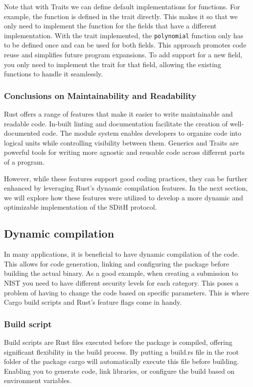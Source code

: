 \documentclass[11pt]{report}
\theoremstyle{definition}
\theoremstyle{plain}
\begin{document}
Note that with Traits we can define default implementations for functions. For example, the  function is defined in the trait directly. This makes it so that we only need to implement the function for the fields that have a different implementation. With the trait implemented, the \texttt{polynomial} function only has to be defined once and can be used for both fields. This approach promotes code reuse and simplifies future program expansions. To add support for a new field, you only need to implement the  trait for that field, allowing the existing functions to handle it seamlessly.

\subsubsection{Conclusions on Maintainability and Readability}
Rust offers a range of features that make it easier to write maintainable and readable code. In-built linting and documentation facilitate the creation of well-documented code. The module system enables developers to organize code into logical units while controlling visibility between them. Generics and Traits are powerful tools for writing more agnostic and reusable code across different parts of a program.

However, while these features support good coding practices, they can be further enhanced by leveraging Rust's dynamic compilation features. In the next section, we will explore how these features were utilized to develop a more dynamic and optimizable implementation of the SDitH protocol.

\subsection{Dynamic compilation}
In many applications, it is beneficial to have dynamic compilation of the code. This allows for code generation, linking and configuring the package before building the actual binary. As a good example, when creating a submission to NIST you need to have different security levels for each category. This poses a problem of having to change the code based on specific parameters. This is where Cargo build scripts and Rust's feature flags come in handy.

\subsubsection{Build script}
Build scripts are Rust files executed before the package is compiled, offering significant flexibility in the build process. By putting a build.rs file in the root folder of the package cargo will automatically execute this file before building. Enabling you to generate code, link libraries, or configure the build based on environment variables.
\end{document}
